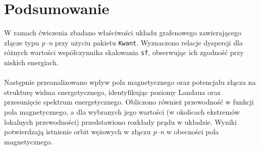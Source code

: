 \documentclass{article}
\begin{document}
\section{Podsumowanie}
W ramach ćwiczenia zbadano właściwości układu grafenowego zawierającego złącze typu \textit{p--n} przy użyciu pakietu \texttt{Kwant}. 
Wyznaczono relacje dyspersji dla różnych wartości współczynnika skalowania \texttt{sf}, obserwując ich zgodność przy niskich energiach. \\
\\
Następnie przeanalizowano wpływ pola magnetycznego oraz potencjału złącza na strukturę widma energetycznego, identyfikując poziomy Landaua oraz przesunięcie spektrum energetycznego. 
Obliczono również przewodność w funkcji pola magnetycznego, a dla wybranych jego wartości (w okolicach ekstremów lokalnych przewodności) przedstawiono rozkłady prądu w układzie. 
Wyniki potwierdzają istnienie orbit wężowych w złączu \textit{p--n} w obecności pola magnetycznego.
\end{document}
